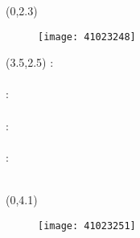 \documentclass[14pt,a4paper]{report}  %
\begin{document}
   \vspace{2em}
	{\begin{textblock}{6}(0,2.3)
	\begin{figure}
	\texttt{[image: 41023248]} 
    \end{figure}
    \end{textblock}}
    {\renewcommand\baselinestretch{0.99}
    \selectfont %
    {\begin{textblock}{15}(3.5,2.5) %
\noindent\fontsize{14pt}{0em}\selectfont {}\enspace:\enspace
\fontsize{14pt}{0em}\selectfont {}\\ 
\hspace*{\fill} \\
\fontsize{14pt}{0em}\selectfont {}\enspace:\enspace
\noindent\fontsize{14pt}{0em}\selectfont {} \\ 
\hspace*{\fill} \\
\fontsize{14pt}{0em}\selectfont {}\enspace:\enspace
\fontsize{14pt}{0em}\selectfont {}\\
\hspace*{\fill} \\
\fontsize{14pt}{0em}\selectfont {}\enspace:\enspace
\fontsize{14pt}{0em}\selectfont {}\\
\fontsize{14pt}{0em}\selectfont \makebox[4em][s]{\quad}\enspace\enspace
\fontsize{14pt}{0em}\selectfont {}\\
    \end{textblock}}}
    \vspace{2em}
    {\begin{textblock}{6}(0,4.1)
    \begin{figure}
        \texttt{[image: 41023251]} %
    \end{figure}
    \end{textblock}}
\end{document}
